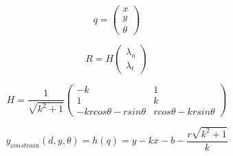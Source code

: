 \documentclass[12 pt]{article}
\begin{document}
\begin{equation}
q=\begin{pmatrix} x \\y \\ \theta \end{pmatrix}
\end{equation}

\begin{equation}
R=H\begin{pmatrix}
\lambda_n
\\ \lambda_t \end{pmatrix}
\end{equation}


\begin{equation}
H=\frac{1}{\sqrt{k^2+1}}\begin{pmatrix}
-k & 1 \\
1 & k \\
-krcos\theta-rsin\theta & rcos\theta-krsin\theta
\end{pmatrix}
\end{equation}

\begin{equation}
y_{constrain}(d,y,\theta)=h(q)=y-kx-b-\frac{r\sqrt{k^2+1}}{k}
\end{equation}
\end{document}
